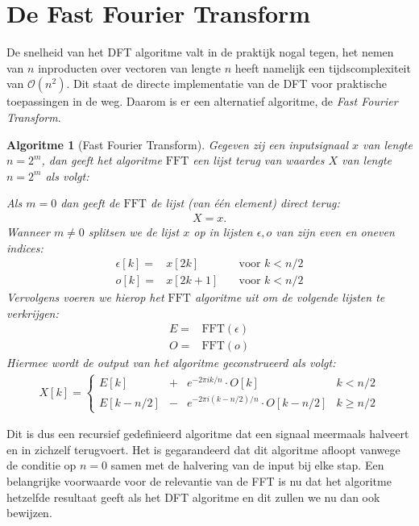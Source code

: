 \documentclass[11pt]{report}
\newcommand{\e}{\epsilon}
\renewcommand{\O}{\mathcal{O}}
\newcommand{\FFT}{\text{FFT}}
\theoremstyle{plain}
\newtheorem*{algo}{Algoritme}
\theoremstyle{remark}
\newcommand{\eq}[1]{\begin{eqnarray*} #1 \end{eqnarray*}}
\newcommand{\dpii}{{2\pi i}}
\begin{document}
\section{De Fast Fourier Transform}
De snelheid van het DFT algoritme valt in de praktijk nogal tegen, het nemen van $n$ inproducten over vectoren 
van lengte $n$ heeft namelijk een tijdscomplexiteit van $\O(n^2)$. Dit staat de directe implementatie van de DFT 
voor praktische toepassingen in de weg. Daarom is er een alternatief algoritme, de \emph{Fast Fourier Transform}.  \bigskip

\begin{algo}[Fast Fourier Transform]
Gegeven zij een inputsignaal $x$ van lengte $n=2^m$, dan geeft het algoritme $\FFT$ 
een lijst terug van waardes $X$ van lengte $n=2^m$ als volgt:

Als $m=0$ dan geeft de $\FFT$ de lijst (van \'e\'en element) direct terug:
\eq{
X = x.
}
Wanneer $m\neq0$ splitsen we de lijst $x$ op in lijsten $\e,o$ van zijn even en oneven indices:
\eq{
  \e[k]   =& x[2k]   &\quad \text{voor } k < n/2\\
   o[k]   =& x[2k+1] &\quad \text{voor } k < n/2
}
Vervolgens voeren we hierop het $\FFT$ algoritme uit om de volgende lijsten te verkrijgen:
\eq{
  E =& \FFT(\e) \\
  O =& \FFT(o)
}
Hiermee wordt de output van het algoritme geconstrueerd als volgt:
\eq{
  X[k] = \left\{\begin{array}{llll}
    E[k]         &+& e^{-\dpii k/n}\cdot O[k] &  k< n/2 \\
    E[k-n/2] &-& e^{-\dpii (k-n/2)/n}\cdot O[k-n/2] &  k\geq n/2 
  \end{array}\right.
}
\end{algo}

Dit is dus een recursief gedefinieerd algoritme dat een signaal meermaals halveert en in zichzelf terugvoert.
Het is gegarandeerd dat dit algoritme afloopt vanwege de conditie op $n=0$ samen met de halvering van de input bij elke stap. Een belangrijke voorwaarde voor de relevantie van de FFT is nu dat het algoritme hetzelfde resultaat geeft als het DFT algoritme en dit zullen we nu dan ook bewijzen. 
\end{document}
